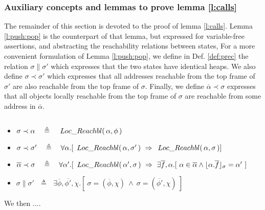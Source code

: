 \vspace{.2cm}
\subsubsection{Auxiliary concepts and lemmas to prove  lemma  \ref{l:calls}}
The remainder of this section is devoted to the proof of lemma  \ref{l:calls}.
%
Lemma \ref{l:push:pop} is  the counterpart of that lemma, but expressed for  variable-free assertions,
and abstracting the reachability relations between states,
 For a more convenient formulation of Lemma \ref{l:push:pop}, we define in Def. \ref{def:prec} the relation  $\sigma \parallel \sigma' $ which expresses that the two states have identical heaps. 
 We also define 
 $\sigma \prec \sigma'$ which expresses that all addresses reachable from the top frame of $\sigma'$ are also reachable from the top frame of $\sigma$. 
Finally, we define  $\overline \alpha \prec \sigma$ expresses that all objects locally reachable from the top frame of $\sigma$ are reachable from some address in $\overline \alpha$.
 
 
 
\begin{definition}
$~ $ %
\label{def:prec}
\begin{itemize}
\item
$\sigma \prec \alpha\ \ \ \triangleq\ \ \ \LRelevant {\alpha} {\phi}$
\item
$\sigma \prec \sigma'\ \ \ \triangleq\ \ \  \forall \alpha.[\ \LRelevant {\alpha} {\sigma'} \ \Rightarrow \  \LRelevant {\alpha} {\sigma}] $
\item
$\overline \alpha \prec \sigma \ \ \ \triangleq\ \ \  \forall \alpha'.[\ \LRelevant {\alpha'} {\sigma} \ \Rightarrow \  \exists \overline f, \alpha. [\ \alpha \in \overline \alpha \wedge 
\interpret \sigma {\alpha.{\overline f}} = \alpha' \ ]$
\item
$\sigma \parallel \sigma'  \ \ \ \triangleq\ \ \ \exists \overline \phi,  \overline {\phi'}, \chi. [\ \sigma=( \overline \phi, \chi )\ \wedge\ 
\sigma=( \overline {\phi'}, \chi )\ ]$
\end{itemize}
\end{definition}

We then ....


